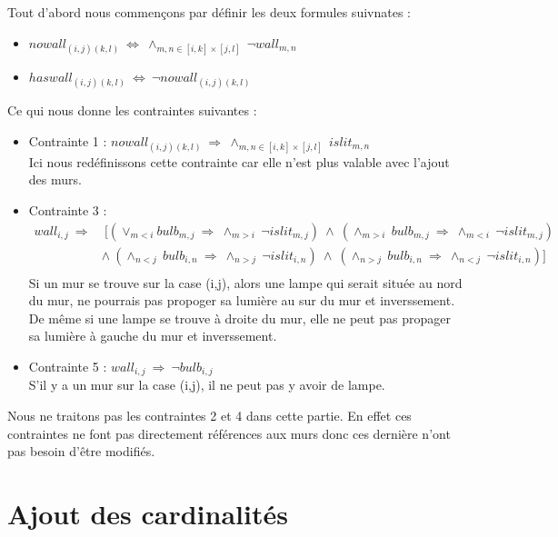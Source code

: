 \documentclass{article}
\begin{document}
Tout d'abord nous commençons par d\'efinir les deux formules suivnates :
\begin{itemize}
\item $ nowall_{(i,j)(k,l)} ~ \Leftrightarrow ~ \wedge_{m,n \in [i,k]\times[j,l]} ~ \neg wall_{m,n} $
\item $ haswall_{(i,j)(k,l)} ~ \Leftrightarrow ~ \neg nowall_{(i,j)(k,l)} $\\
\end{itemize}
Ce qui nous donne les contraintes suivantes :
\begin{itemize}
  
\item Contrainte 1 : $ nowall_{(i,j)(k,l)} ~ \Rightarrow ~ \wedge_{m,n \in [i,k]\times[j,l]} ~ islit_{m,n} $ \\
  Ici nous redéfinissons cette contrainte car elle n'est plus valable avec l'ajout des murs. 
\item Contrainte 3 :
\begin{align}
\nonumber
 wall_{i,j} ~ \Rightarrow &~ [(\vee_{m<i}bulb_{m,j} ~ \Rightarrow ~ \wedge_{m>i} ~ \neg islit_{m,j})~\wedge ~ (\wedge_{m>i} ~ bulb_{m,j} ~ \Rightarrow ~ \wedge_{m<i} ~ \neg islit_{m,j})\\
\nonumber
& \wedge ~ (\wedge_{n<j} ~ bulb_{i,n} ~ \Rightarrow ~ \wedge_{n>j} ~ \neg islit_{i,n})~ \wedge ~ (\wedge_{n>j} ~ bulb_{i,n} ~ \Rightarrow ~ \wedge_{n<j} ~ \neg islit_{i,n})]\\
\nonumber
\end{align}
Si un mur se trouve sur la case (i,j), alors une lampe qui serait située au nord du mur, ne pourrais pas propoger sa lumière au sur du mur et inverssement. De même si une lampe se trouve à droite du mur, elle ne peut pas propager sa lumière à gauche du mur et inverssement.
\item Contrainte 5 : $ wall_{i,j} ~ \Rightarrow ~ \neg bulb_{i,j} $\\
S'il y a un mur sur la case (i,j), il ne peut pas y avoir de lampe.
\end{itemize}
Nous ne traitons pas les contraintes 2 et 4 dans cette partie. En effet ces contraintes ne font pas directement réf\'erences aux murs donc ces dernière n'ont pas besoin d'être modifiés. 

\section{Ajout des cardinalit\'es}
\end{document}
